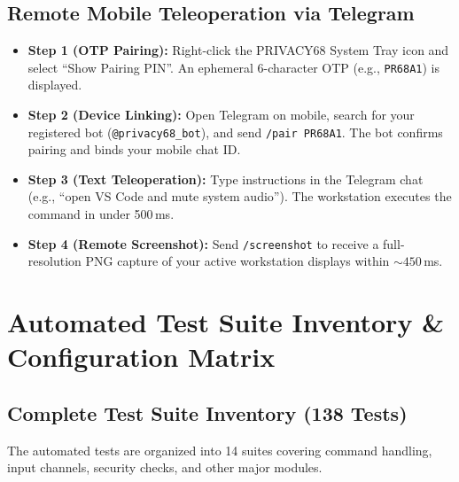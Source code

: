 \documentclass[12pt,letterpaper,oneside]{report}
\begin{document}
\section{Remote Mobile Teleoperation via Telegram}
\begin{itemize}
    \item \textbf{Step 1 (OTP Pairing):} Right-click the PRIVACY68 System Tray icon and select ``Show Pairing PIN''. An ephemeral 6-character OTP (e.g., \texttt{PR68A1}) is displayed.
    \item \textbf{Step 2 (Device Linking):} Open Telegram on mobile, search for your registered bot (\texttt{@privacy68\_bot}), and send \texttt{/pair PR68A1}. The bot confirms pairing and binds your mobile chat ID.
    \item \textbf{Step 3 (Text Teleoperation):} Type instructions in the Telegram chat (e.g., ``open VS Code and mute system audio''). The workstation executes the command in under 500\,ms.
    \item \textbf{Step 4 (Remote Screenshot):} Send \texttt{/screenshot} to receive a full-resolution PNG capture of your active workstation displays within $\sim 450$\,ms.
\end{itemize}

\chapter{Automated Test Suite Inventory \& Configuration Matrix}
\section{Complete Test Suite Inventory (138 Tests)}
The automated tests are organized into 14 suites covering command handling, input channels, security checks, and other major modules.
\end{document}
